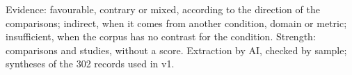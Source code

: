 \begin{table}[!tp]
\begin{tabular}{p{0.55cm}p{2.0cm}p{2.4cm}p{1.9cm}p{5.6cm}p{1.6cm}p{3.1cm}}
\hline
\end{tabular}
\par\smallskip
\parbox{\textwidth}{\scriptsize Evidence: favourable, contrary or mixed, according to the direction of the comparisons; indirect, when it comes from another condition, domain or metric; insufficient, when the corpus has no contrast for the condition. Strength: comparisons and studies, without a score. Extraction by AI, checked by sample; syntheses of the 302 records used in v1.}
\end{table}
